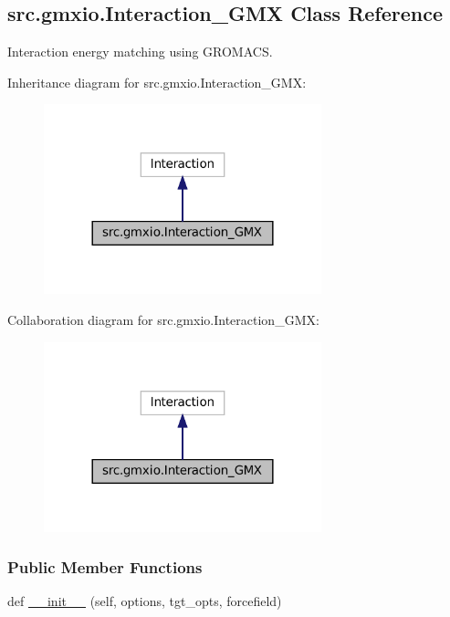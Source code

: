 \hypertarget{classsrc_1_1gmxio_1_1Interaction__GMX}{}\subsection{src.\+gmxio.\+Interaction\+\_\+\+G\+MX Class Reference}
\label{classsrc_1_1gmxio_1_1Interaction__GMX}


Interaction energy matching using G\+R\+O\+M\+A\+CS.  




Inheritance diagram for src.\+gmxio.\+Interaction\+\_\+\+G\+MX\+:
\nopagebreak
\begin{figure}[H]
\begin{center}
\leavevmode
\includegraphics[width=228pt]{classsrc_1_1gmxio_1_1Interaction__GMX__inherit__graph}
\end{center}
\end{figure}


Collaboration diagram for src.\+gmxio.\+Interaction\+\_\+\+G\+MX\+:
\nopagebreak
\begin{figure}[H]
\begin{center}
\leavevmode
\includegraphics[width=228pt]{classsrc_1_1gmxio_1_1Interaction__GMX__coll__graph}
\end{center}
\end{figure}
\subsubsection*{Public Member Functions}
\begin{DoxyCompactItemize}
\item 
def \hyperlink{classsrc_1_1gmxio_1_1Interaction__GMX_abf26d1083a7a68b119f684abf87e9d2b}{\+\_\+\+\_\+init\+\_\+\+\_\+} (self, options, tgt\+\_\+opts, forcefield)
\end{DoxyCompactItemize}
